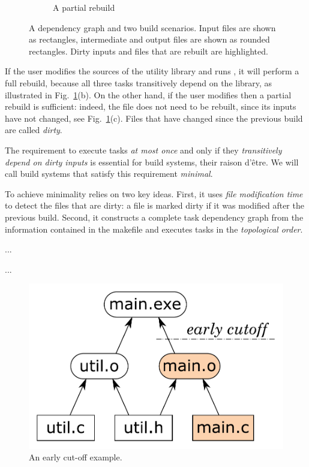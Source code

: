 \begin{figure}[h]
\begin{subfigure}[b]{0.32\linewidth}
\caption{A partial rebuild}
\end{subfigure}
\caption{A dependency graph and two build scenarios. Input files are shown as
rectangles, intermediate and output files are shown as rounded rectangles. Dirty
inputs and files that are rebuilt are highlighted.
\label{fig-make}}
\end{figure}

If the user modifies the sources of the utility library and runs \Make, it will
perform a full rebuild, because all three tasks transitively depend on the
library, as illustrated in Fig.~\ref{fig-make}(b). On the other hand, if the
user modifies  then a partial rebuild is sufficient: indeed, the
file  does not need to be rebuilt, since its inputs have not
changed, see Fig.~\ref{fig-make}(c). Files that have changed since the previous
build are called \emph{dirty}.

The requirement to execute tasks \emph{at most once} and only if they
\emph{transitively depend on dirty inputs} is essential for build systems,
their raison d'\^etre. We will call build systems that satisfy this requirement
\emph{minimal}.

To achieve minimality \Make relies on two key ideas. First, it uses \emph{file
modification time} to detect the files that are dirty: a file is marked dirty if
it was modified after the previous build. Second, it constructs a complete task
dependency graph from the information contained in the makefile and executes
tasks in the \emph{topological order}.

...

\Excel

...

\Shake

\begin{figure}[h]
\centerline{\includegraphics[scale=0.28]{fig/make-example-cutoff.pdf}}
\caption{An early cut-off example.\label{fig-cutoff}}
\end{figure}



